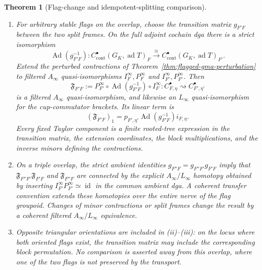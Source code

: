 \documentclass[11pt]{article}
\newtheorem{theorem}{Theorem}[section]
\theoremstyle{definition}
\begin{document}
\begin{theorem}[Flag-change and idempotent-splitting comparison]
\begin{enumerate}[label=\textnormal{(\roman*)}]
\item For arbitrary stable flags on the overlap, choose the transition matrix
$g_{F'F}$ between the two split frames.  On the full adjoint cochain dga there
is a strict isomorphism
\begin{equation}\label{eq:flag-change-ambient-conjugation}
 \operatorname{Ad}(g_{F'F}^{-1}):
 C^\bullet_{\mathrm{cont}}(G_K,\operatorname{ad}T)_F
 \xrightarrow{\ \cong\ }
 C^\bullet_{\mathrm{cont}}(G_K,\operatorname{ad}T)_{F'}.
\end{equation}
Extend the perturbed contractions of Theorem~\ref{thm:flagged-gma-perturbation}
to filtered $A_\infty$ quasi-isomorphisms
$I_F^\infty,P_F^\infty$ and $I_{F'}^\infty,P_{F'}^\infty$.  Then
\begin{equation}\label{eq:flag-change-ainfty-transition}
 \mathfrak F_{F'F}
 :=P_{F'}^\infty\circ
   \operatorname{Ad}(g_{F'F}^{-1})\circ I_F^\infty
 :C_{F,\eta}^\bullet\rightsquigarrow C_{F',\eta'}^\bullet
\end{equation}
is a filtered $A_\infty$ quasi-isomorphism, and likewise an $L_\infty$
quasi-isomorphism for the cup-commutator brackets.  Its linear term is
\begin{equation}\label{eq:flag-change-linear-term}
 (\mathfrak F_{F'F})_1
 =p_{F',\eta'}\operatorname{Ad}(g_{F'F}^{-1})i_{F,\eta}.
\end{equation}
Every fixed Taylor component is a finite rooted-tree expression in the
transition matrix, the extension coordinates, the block multiplications, and
the inverse minors defining the contractions.

\item On a triple overlap, the strict ambient identities
$g_{F''F}=g_{F''F'}g_{F'F}$ imply that
$\mathfrak F_{F''F'}\mathfrak F_{F'F}$ and $\mathfrak F_{F''F}$ are connected
by the explicit $A_\infty/L_\infty$ homotopy obtained by inserting
$ I_{F'}^\infty P_{F'}^\infty\simeq\operatorname{id}$ in the common ambient
dga.  A coherent transfer convention extends these homotopies over the entire
nerve of the flag groupoid.  Changes of minor contractions or split frames
change the result by a coherent filtered $A_\infty/L_\infty$ equivalence.

\item Opposite triangular orientations are included in (ii)--(iii): on the
locus where both oriented flags exist, the transition matrix may include the
corresponding block permutation.  No comparison is asserted away from this
overlap, where one of the two flags is not preserved by the transport.
\end{enumerate}
\end{theorem}
\end{document}
